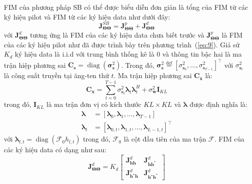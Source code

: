 FIM của phương pháp SB có thể được biểu diễn đơn giản là tổng của FIM từ các ký hiệu pilot và FIM từ các ký hiệu data như dưới đây:
\begin{equation}
    \label{eq:17}
    \mathbf{J}_{\boldsymbol{\Theta} \boldsymbol{\Theta}}^{SB}= \mathbf{J}_{\boldsymbol{\Theta} \boldsymbol{\Theta}}^{p} + \mathbf{J}_{\boldsymbol{\Theta} \boldsymbol{\Theta}}^{d}
\end{equation}
với $\mathbf{J}_{\boldsymbol{\Theta} \boldsymbol{\Theta}}^{d}$ tương ứng là FIM của các ký hiệu data chưa biết trước và $\mathbf{J}_{\boldsymbol{\Theta} \boldsymbol{\Theta}}^{p}$ là FIM của các ký hiệu pilot như đã được trình bày trên phương trình~(\ref{eq:9}). Giả sử $K_d$ ký hiệu data là i.i.d với trung bình thống kê là $0$ và thông tin bậc hai là ma trận hiệp phương sai $\mathbf{C}_{\mathbf{s}}=\operatorname{diag}\left(\boldsymbol{\sigma}^2_{\mathbf{s}}\right)$. Trong đó, $\boldsymbol{\sigma}_{\mathbf{s}}^{2} \stackrel{\operatorname{def}}{=}\left[\sigma_{\mathbf{s}_{0}}^{2}, \ldots, \sigma_{\mathbf{s}_{T-1}}^{2}\right]^\top$ với $\sigma^2_{\mathbf{s}_t}$ là công suất truyền tại ăng-ten thứ $t$. Ma trận hiệp phương sai $\mathbf{C}_{\mathbf{x}}$ là:
\begin{equation}
    \mathbf{C}_{\mathbf{x}}=\sum_{t=0}^{T-1} \sigma_{\mathbf{s}_{t}}^{2} \boldsymbol{\lambda}_{t} \boldsymbol{\lambda}_{t}^{H}+\sigma_{\mathbf{w}}^{2} \mathbf{I}_{K L}
\end{equation}
trong đó, $\mathbf{I}_{KL}$ là ma trận đơn vị có kích thước $K L \times KL$ và $\boldsymbol{\lambda}$ được định nghĩa là:
\begin{equation}
    \begin{aligned}
        \boldsymbol{\lambda} &=\left[\boldsymbol{\lambda}_{0}, \boldsymbol{\lambda}_{1}, \ldots, \boldsymbol{\lambda}_{T-1}\right] \\ 
        \boldsymbol{\lambda}_{t}&=\left[\boldsymbol{\lambda}_{0, t}, \boldsymbol{\lambda}_{1, t}, \ldots, \boldsymbol{\lambda}_{L-1, t}\right]^{\top}
    \end{aligned}
\end{equation}
với $\boldsymbol{\lambda}_{l, t}=\operatorname{diag}\left(\mathcal{F}_0 h_{l, t}\right)$ trong đó, $\mathcal{F}_0$ là cột đầu tiên của ma trận $\mathcal{F}$. FIM của các ký hiệu data có dạng như sau:
\begin{equation}
    \mathbf{J}_{\boldsymbol{\Theta} \boldsymbol{\Theta}}^{d}=K_{d}\left[\begin{array}{cc}
    \mathbf{J}_{\mathbf{h} \mathbf{h}}^{d} & \mathbf{J}_{\mathbf{h} \mathbf{h}^{*}}^{d} \\
    \mathbf{J}_{\mathbf{h}^{\star} \mathbf{h}}^{d} & \mathbf{J}_{\mathbf{h}^{\star} \mathbf{h}^{*}}^{d}
    \end{array}\right]
\end{equation}

